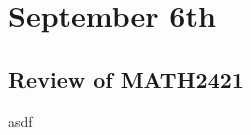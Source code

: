 \documentclass[../main/main.tex]{subfiles}
\begin{document}
\section{September 6th}
\subsection{Review of MATH2421}
asdf
\end{document}
